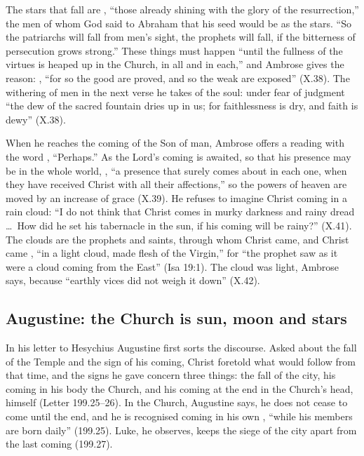 The stars that fall are , ``those already shining with the glory of the resurrection,'' the
men of whom God said to Abraham that his seed would be as the stars. ``So the
patriarchs will fall from men's sight, the prophets will fall, if the
bitterness of persecution grows strong.'' These things must happen ``until
the fullness of the virtues is heaped up in the Church, in all and in each,''
and Ambrose gives the reason: , ``for so the good are proved, and so the weak are exposed''
(X.38). The withering of men in the next verse he takes of the soul: under
fear of judgment ``the dew of the sacred fountain dries up in us; for
faithlessness is dry, and faith is dewy'' (X.38).

When he reaches the coming of the Son of man, Ambrose offers a reading with
the word , ``Perhaps.'' As the Lord's coming is awaited, so
that his presence may be in the whole world, , ``a presence that
surely comes about in each one, when they have received Christ with all their
affections,'' so the powers of heaven are moved by an increase of grace
(X.39). He refuses to imagine Christ coming in a rain cloud: ``I do not think
that Christ comes in murky darkness and rainy dread \dots\ How did he set his
tabernacle in the sun, if his coming will be rainy?'' (X.41). The clouds are
the prophets and saints, through whom Christ came, and Christ came , ``in a light cloud, made flesh of the
Virgin,'' for ``the prophet saw as it were a cloud coming from the East'' (Isa
19:1). The cloud was light, Ambrose says, because ``earthly vices did not weigh it down''
(X.42).

\subsection{Augustine: the Church is sun, moon and stars}

In his letter to Hesychius Augustine first sorts the discourse. Asked about
the fall of the Temple and the sign of his coming, Christ foretold what would
follow from that time, and the signs he gave concern three things: the fall
of the city, his coming in his body the Church, and his coming at the end in
the Church's head, himself (Letter 199.25--26). In the Church, Augustine
says, he does not cease to come until the end, and he is recognised coming in
his own , ``while his members are
born daily'' (199.25). Luke, he observes, keeps the siege of the city apart
from the last coming (199.27).

